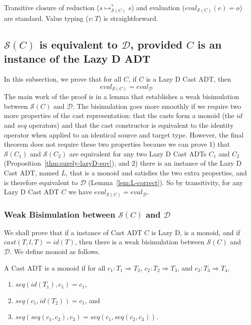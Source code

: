 \documentclass[acmsmall,review,anonymous]{acmart}\settopmatter{printfolios=true,printccs=false,printacmref=false}
\newcommand{\judgeType}[2]{#1 : #2}
\newcommand{\judgeSreduceTrans}[3]{#2 \longmapsto_{\mathcal{S}(#1)}^{*} #3}
\newcommand{\judgeSeval}[3]{eval_{\mathcal{S}(#1)}(#2) = #3}
\newcommand{\ineffCEKD}{$\mathcal{D}$}
\newcommand{\effCEK}[1]{$\mathcal{S}(#1)$}
\newcommand{\evalEqv}[2]{\ensuremath{eval_{\text{#1}} = eval_{\text{#2}}}}
\begin{document}
Transitive closure of reduction ($\judgeSreduceTrans{C}{s}{s}$) and 
evaluation ($\judgeSeval{C}{e}{o}$) are standard. Value typing 
($\judgeType{v}{T}$) is straightforward.

\subsection{\effCEK{C} is equivalent to \ineffCEKD{}, provided $C$ is an instance of the Lazy D ADT}
\label{secc:framework:monoid-correct}

In this subsection, we prove that for all $C$, if $C$ is a Lazy D Cast
ADT, then
\[
  \evalEqv{\effCEK{C}}{\ineffCEKD}
\]
The main work of the proof is in a lemma that establishes a weak
bisimulation between \effCEK{C} and \ineffCEKD{}.  The bisimulation
goes more smoothly if we require two more properties of the cast
representation: that the casts form a monoid (the $id$ and $seq$
operators) and that the cast constructor is equivalent to the identity
operator when applied to an identical source and target type.
However, the final theorem does not require these two properties
because we can prove 1) that \effCEK{C_1} and \effCEK{C_2} are
equivalent for any two Lazy D Cast ADTs $C_1$ and $C_2$
(Proposition~\ref{thm:surely-lazyD-eqv}), and 2) there is an instance
of the Lazy D Cast ADT, named $L$, that is a monoid and satisfies the
two extra properties, and is therefore equivalent to \ineffCEKD{}
(Lemma~\ref{lem:L-correct}). So by transitivity, for any Lazy D Cast
ADT $C$ we have \evalEqv{\effCEK{C}}{\ineffCEKD}.

\subsubsection{Weak Bisimulation between \effCEK{C} and \ineffCEKD{}}

We shall prove that if a instance of Cast ADT $C$ is Lazy D, is a
monoid, and if $cast(T,l,T) = id(T)$, then there is
a weak bisimulation between \effCEK{C} and \ineffCEKD{}.
We define monoid as follows.

\begin{definition}[Monoid]
  A Cast ADT is a monoid if 
  for all
  $c_1 : T_1 \Longrightarrow T_2$,
  $c_2 : T_2 \Longrightarrow T_3$, and
  $c_3 : T_3 \Longrightarrow T_4$,
  \begin{enumerate}
    \item $seq(id(T_1),c_1) = c_1$,
    \item $seq(c_1,id(T_2)) = c_1$, and
    \item $seq(seq(c_1, c_2), c_3) = seq(c_1, seq(c_2, c_3))$.
  \end{enumerate}
\end{definition}
\end{document}
